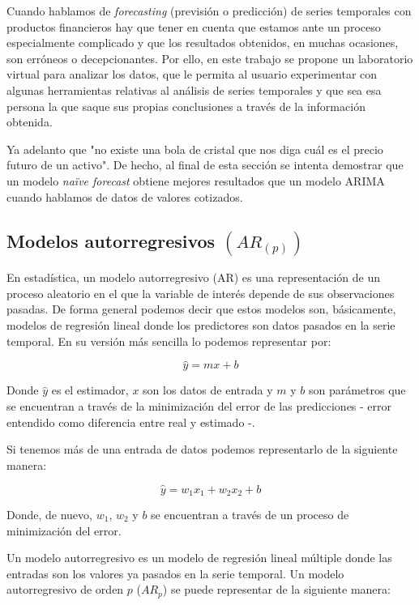 Cuando hablamos de \emph{forecasting} (previsión o predicción) de series temporales con productos financieros hay que tener en cuenta que estamos ante un proceso especialmente complicado y que los resultados obtenidos, en muchas ocasiones, son erróneos o decepcionantes. Por ello, en este trabajo se propone un laboratorio virtual para analizar los datos, que le permita al usuario experimentar con algunas herramientas relativas al análisis de series temporales y que sea esa persona la que saque sus propias conclusiones a través de la información obtenida. 

Ya adelanto que "no existe una bola de cristal que nos diga cuál es el precio futuro de un activo". De hecho, al final de esta sección se intenta demostrar que un modelo \emph{naïve forecast} obtiene mejores resultados que un modelo ARIMA cuando hablamos de datos de valores cotizados. 


\subsection{Modelos autorregresivos $(AR_{(p)})$}

En estadística, un modelo autorregresivo (AR) es una representación de un proceso aleatorio en el que la variable de interés depende de sus observaciones pasadas. De forma general podemos decir que estos modelos son, básicamente, modelos de regresión lineal donde los predictores son datos pasados en la serie temporal. En su versión más sencilla lo podemos representar por:

\begin{equation}
	\hat{y} = mx + b
\end{equation}

Donde $\hat{y}$ es el estimador, $x$ son los datos de entrada y $m$ y $b$ son parámetros que se encuentran a través de la minimización del error de las predicciones - error entendido como diferencia entre real y estimado -. 

Si tenemos más de una entrada de datos podemos representarlo de la siguiente manera:

\begin{equation}
	\hat{y} = w_{1}x_{1} + w_{2}x_{2} + b
\end{equation}

Donde, de nuevo, $w_{1}$, $w_{2}$ y $b$ se encuentran a través de un proceso de minimización del error. 

Un modelo autorregresivo es un modelo de regresión lineal múltiple donde las entradas son los valores ya pasados en la serie temporal. Un modelo autorregresivo de orden $p$ ($AR_{p}$) se puede representar de la siguiente manera:

